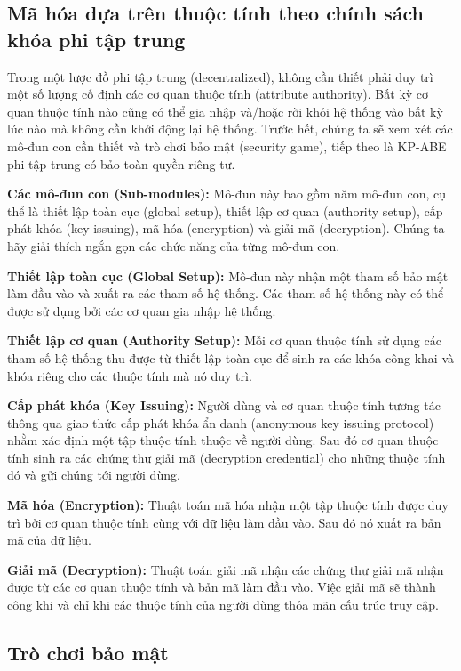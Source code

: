 \subsection{Mã hóa dựa trên thuộc tính theo chính sách khóa phi tập trung}

Trong một lược đồ phi tập trung (decentralized), không cần thiết phải duy trì một số lượng cố định các cơ quan thuộc tính (attribute authority). Bất kỳ cơ quan thuộc tính nào cũng có thể gia nhập và/hoặc rời khỏi hệ thống vào bất kỳ lúc nào mà không cần khởi động lại hệ thống. Trước hết, chúng ta sẽ xem xét các mô-đun con cần thiết và trò chơi bảo mật (security game), tiếp theo là KP-ABE phi tập trung có bảo toàn quyền riêng tư.

\textbf{Các mô-đun con (Sub-modules):} Mô-đun này bao gồm năm mô-đun con, cụ thể là thiết lập toàn cục (global setup), thiết lập cơ quan (authority setup), cấp phát khóa (key issuing), mã hóa (encryption) và giải mã (decryption). Chúng ta hãy giải thích ngắn gọn các chức năng của từng mô-đun con.

\textbf{Thiết lập toàn cục (Global Setup):} Mô-đun này nhận một tham số bảo mật làm đầu vào và xuất ra các tham số hệ thống. Các tham số hệ thống này có thể được sử dụng bởi các cơ quan gia nhập hệ thống.

\textbf{Thiết lập cơ quan (Authority Setup):} Mỗi cơ quan thuộc tính sử dụng các tham số hệ thống thu được từ thiết lập toàn cục để sinh ra các khóa công khai và khóa riêng cho các thuộc tính mà nó duy trì.

\textbf{Cấp phát khóa (Key Issuing):} Người dùng và cơ quan thuộc tính tương tác thông qua giao thức cấp phát khóa ẩn danh (anonymous key issuing protocol) nhằm xác định một tập thuộc tính thuộc về người dùng. Sau đó cơ quan thuộc tính sinh ra các chứng thư giải mã (decryption credential) cho những thuộc tính đó và gửi chúng tới người dùng.

\textbf{Mã hóa (Encryption):} Thuật toán mã hóa nhận một tập thuộc tính được duy trì bởi cơ quan thuộc tính cùng với dữ liệu làm đầu vào. Sau đó nó xuất ra bản mã của dữ liệu.

\textbf{Giải mã (Decryption):} Thuật toán giải mã nhận các chứng thư giải mã nhận được từ các cơ quan thuộc tính và bản mã làm đầu vào. Việc giải mã sẽ thành công khi và chỉ khi các thuộc tính của người dùng thỏa mãn cấu trúc truy cập.

\subsection{Trò chơi bảo mật}

